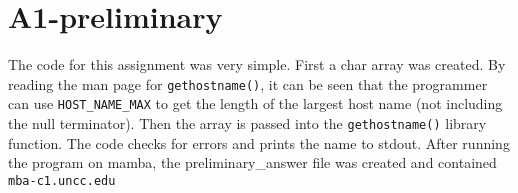 \documentclass{article}
\begin{document}
	\section{A1-preliminary}
	The code for this assignment was very simple. First a char array was created. By reading the man page for \lstinline{gethostname()}, it can be seen that the programmer can use \lstinline{HOST_NAME_MAX} to get the length of the largest host name (not including the null terminator). Then the array is passed into the \lstinline{gethostname()} library function. The code checks for errors and prints the name to stdout. After running the program on mamba, the preliminary\_answer file was created and contained \lstinline{mba-c1.uncc.edu}
\end{document}
